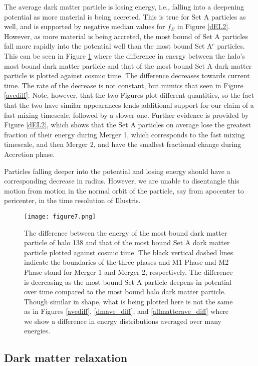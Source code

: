 \documentclass[a4paper,11pt]{article}
\begin{document}
The average dark matter particle is losing energy, i.e., falling into a deepening potential as more material is being accreted.  This is true for Set A 
particles as well, and is supported by negative median values for $f_E$ in Figure \ref{dEL2}.  However, as more material is 
being accreted, the most bound of Set A particles fall more rapidly into the potential well than the most bound Set A$^c$ particles.  This can be seen in 
Figure \ref{avebounddiff} where the difference in energy between the halo's most bound dark matter particle and that of the most bound Set A dark matter particle is plotted 
against cosmic time.  The difference decreases towards current time.
The rate of the decrease is not constant, but mimics that seen in Figure \ref{avediff}.  Note, however, that the two Figures plot different quantities, so 
the fact that the two have similar appearances lends additional support for our claim of a fast mixing timescale, followed by a slower one.  Further evidence 
is provided by Figure \ref{dEL2}, which shows that the Set A particles on average lose the greatest fraction of their 
energy during Merger 1, which corresponds to the fast mixing timescale, and then Merger 2, and have the smallest fractional change during Accretion phase.   

Particles falling deeper into the potential and losing energy should have a corresponding decrease in radius.  However, we are unable to disentangle this 
motion from motion in the normal orbit of the particle, say from apocenter to pericenter, in the time resolution of Illustris.

\begin{figure}
\centering
\texttt{[image: figure7.png]}
\caption{The difference between the energy of the most bound dark matter particle of halo 138 and that of the most bound Set A dark matter particle plotted 
against cosmic time.  The black vertical dashed lines indicate the boundaries of the three phases and M1 Phase and M2 Phase stand for Merger 1 and Merger 2, 
respectively.  The difference is decreasing as the most bound Set A particle deepens in potential over time compared to the most bound halo dark matter particle.  
Though similar in shape, what is being plotted here is not the same as in Figures \ref{avediff}, \ref{dmave_diff}, and \ref{allmatterave_diff} where we show a difference in energy 
distributions averaged over many energies.}
\label{avebounddiff}
\end{figure}

\subsection{Dark matter relaxation}\label{DMrelax}
\end{document}
